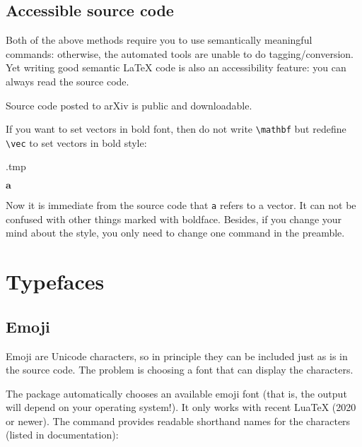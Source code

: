 %
%
\subsection{Accessible source code}

Both of the above methods require you to use semantically meaningful commands:
otherwise, the automated tools are unable to do tagging/conversion.
Yet writing good semantic \LaTeX{} code is also an accessibility feature:
you can always read the source code.

\begin{remark}
Source code posted to arXiv is public and downloadable.
\end{remark}

If you want to set vectors in bold font, then do not write \verb|\mathbf| but
redefine \verb|\vec| to set vectors in bold style:
%
\begin{VerbatimOut}{\jobname.tmp}
\renewcommand{\vec}{\mathbf}

$\vec a$
\end{VerbatimOut}
\ShowExample
%
Now it is immediate from the source code that \verb|a| refers to a vector.
It can not be confused with other things marked with boldface.
Besides, if you change your mind about the style,
you only need to change one command in the preamble.


%
%
%
\section{Typefaces}\label{sec:typefaces}



\subsection{Emoji}\label{sec:emoji}

Emoji are Unicode characters, so in principle they can be included just as is in the source code.
The problem is choosing a font that can display the characters.

The  package automatically chooses an available emoji font
(that is, the output will depend on your operating system!).
It only works with recent LuaTeX (2020 or newer).
The command provides readable shorthand names for the characters (listed in documentation):
%
\begin{ExampleCode}
\usepackage{emoji}

\end{ExampleCode}

